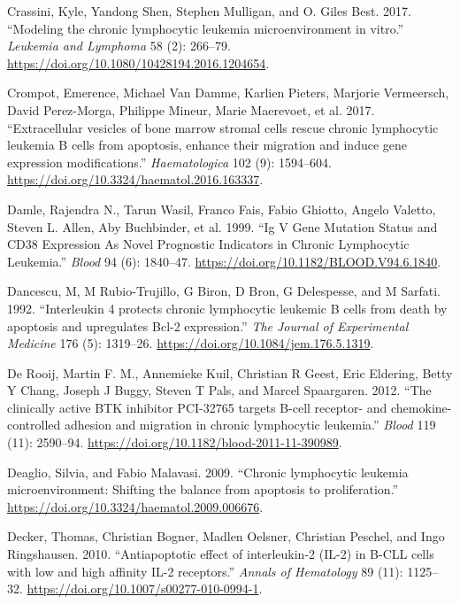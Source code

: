 \documentclass[11pt, a4paper, twosided]{book}
\newenvironment{CSLReferences}%
  {}%
  {\par}
\begin{document}
\begin{CSLReferences}{1}{0}
\leavevmode{}%
Crassini, Kyle, Yandong Shen, Stephen Mulligan, and O. Giles Best. 2017. {``{Modeling the chronic lymphocytic leukemia microenvironment in vitro}.''} \emph{Leukemia and Lymphoma} 58 (2): 266--79. \url{https://doi.org/10.1080/10428194.2016.1204654}.

\leavevmode{}%
Crompot, Emerence, Michael Van Damme, Karlien Pieters, Marjorie Vermeersch, David Perez-Morga, Philippe Mineur, Marie Maerevoet, et al. 2017. {``{Extracellular vesicles of bone marrow stromal cells rescue chronic lymphocytic leukemia B cells from apoptosis, enhance their migration and induce gene expression modifications}.''} \emph{Haematologica} 102 (9): 1594--604. \url{https://doi.org/10.3324/haematol.2016.163337}.

\leavevmode{}%
Damle, Rajendra N., Tarun Wasil, Franco Fais, Fabio Ghiotto, Angelo Valetto, Steven L. Allen, Aby Buchbinder, et al. 1999. {``{Ig V Gene Mutation Status and CD38 Expression As Novel Prognostic Indicators in Chronic Lymphocytic Leukemia}.''} \emph{Blood} 94 (6): 1840--47. \url{https://doi.org/10.1182/BLOOD.V94.6.1840}.

\leavevmode{}%
Dancescu, M, M Rubio-Trujillo, G Biron, D Bron, G Delespesse, and M Sarfati. 1992. {``{Interleukin 4 protects chronic lymphocytic leukemic B cells from death by apoptosis and upregulates Bcl-2 expression.}''} \emph{The Journal of Experimental Medicine} 176 (5): 1319--26. \url{https://doi.org/10.1084/jem.176.5.1319}.

\leavevmode{}%
De Rooij, Martin F. M., Annemieke Kuil, Christian R Geest, Eric Eldering, Betty Y Chang, Joseph J Buggy, Steven T Pals, and Marcel Spaargaren. 2012. {``{The clinically active BTK inhibitor PCI-32765 targets B-cell receptor- and chemokine-controlled adhesion and migration in chronic lymphocytic leukemia}.''} \emph{Blood} 119 (11): 2590--94. \url{https://doi.org/10.1182/blood-2011-11-390989}.

\leavevmode{}%
Deaglio, Silvia, and Fabio Malavasi. 2009. {``{Chronic lymphocytic leukemia microenvironment: Shifting the balance from apoptosis to proliferation}.''} \url{https://doi.org/10.3324/haematol.2009.006676}.

\leavevmode{}%
Decker, Thomas, Christian Bogner, Madlen Oelsner, Christian Peschel, and Ingo Ringshausen. 2010. {``{Antiapoptotic effect of interleukin-2 (IL-2) in B-CLL cells with low and high affinity IL-2 receptors}.''} \emph{Annals of Hematology} 89 (11): 1125--32. \url{https://doi.org/10.1007/s00277-010-0994-1}.


\end{CSLReferences}
\end{document}
